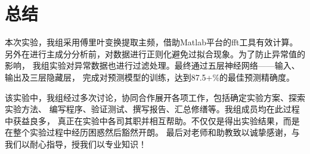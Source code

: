 \section{总结}

本次实验，我组采用傅里叶变换提取主频，借助Matlab平台的fft工具有效计算。
另外在进行主成分分析前，对数据进行正则化避免过拟合现象。为了防止异常值的影响，
我组实验对异常数据也进行过滤处理。最终通过五层神经网络——输入、输出及三层隐藏层，
完成对预测模型的训练，达到87.5+\%的最佳预测精确度。

该实验中，我组经过多次讨论，协同合作展开各项工作，包括确定实验方案、探索实验方法、
编写程序、验证测试、撰写报告、汇总修缮等。我组成员均在此过程中获益良多，
真正在实验中各司其职并相互帮助。不仅仅是得出实验结果，而是在整个实验过程中经历困惑然后豁然开朗。
最后对老师和助教致以诚挚感谢，与我们以耐心指导，授我们以专业知识！
